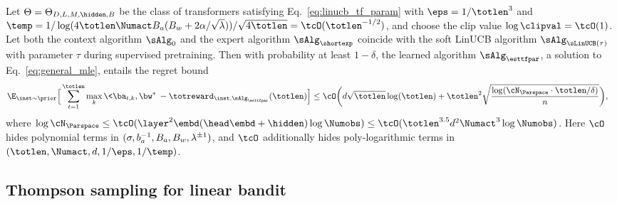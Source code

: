 \documentclass[10pt]{article}
\newcommand{\authnote}[2]{{\scriptsize $\ll$\textsf{#1 notes: #2}$\gg$}}
\newcommand{\authnote}[2]{}
\newcommand{\lc}[1]{{\color{blue}\authnote{Licong}{#1}}}
\begin{document}
\begin{theorem}\label{thm:smooth_linucb}
Let $\Theta = \Theta_{D, L, M, \hidden, B}$ be the class of transformers satisfying Eq.~\eqref{eq:linucb_tf_param} with $\eps=1/\totlen^3$ and $\temp = 1/ \log(4\totlen\Numact B_a(B_w+2\alpha/\sqrt{\lambda}))/\sqrt{4\totlen}=\tcO(\totlen^{-1/2})$, and choose the clip value $\log\clipval = \tcO(1)$. Let both the context algorithm $\sAlg_0$ and the expert algorithm $\sAlg_\shortexp$ coincide with the soft LinUCB algorithm $\sAlg_{\sLinUCB(\tau)}$ with parameter $\tau$ during supervised pretraining. Then with probability at least $1-\delta$, the learned algorithm $\sAlg_{\esttfpar}$, a solution to Eq.~\eqref{eq:general_mle}, entails the regret bound
\begin{align*}
\E_{\inst\sim\prior}\Big[\sum_{t=1}^\totlen\max_{k}\<\ba_{t,k},\bw^*\>-\totreward_{\inst,\sAlg_\esttfpar}(\totlen)\Big]&\leq   \cO\bigg( d\sqrt{\totlen}\log(\totlen)+ \totlen^2\sqrt{\frac{\log ( \cN_{\Parspace} \cdot \totlen/\delta )}{n} } \bigg),
\end{align*}
where $\log \cN_{\Parspace} \le \tcO(\layer^2\embd(\head\embd+\hidden) \log\Numobs) \leq \tcO(\totlen^{3.5} d^2 \Numact^3\log\Numobs)$. Here $\cO$ hides polynomial terms in $(\sigma, b_a^{-1}, B_a, \\B_w, \lambda^{\pm1})$, and $\tcO$ additionally hides poly-logarithmic terms in $(\totlen, \Numact, d, 1/\eps,1/\temp)$. 
\end{theorem}



\subsection{Thompson sampling for linear bandit}\label{sec:TS-statement}
\end{document}
